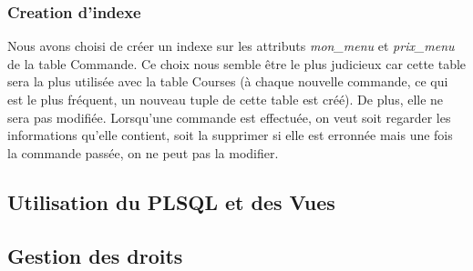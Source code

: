 \documentclass[french]{article}
\begin{document}
            \subsubsection*{Creation d'indexe}
                Nous avons choisi de créer un indexe sur les attributs \textit{mon\_menu} et \textit{prix\_menu} de la table Commande. Ce choix nous semble être le plus judicieux car cette table sera la plus utilisée avec la table Courses (à chaque nouvelle commande, ce qui est le plus fréquent, un nouveau tuple de cette table est créé). De plus, elle ne sera pas modifiée. Lorsqu'une commande est effectuée, on veut soit regarder les informations qu'elle contient, soit la supprimer si elle est erronnée mais une fois la commande passée, on ne peut pas la modifier.

        \subsection*{Utilisation du PLSQL et des Vues}

        \subsection*{Gestion des droits}

        
        
\end{document}
